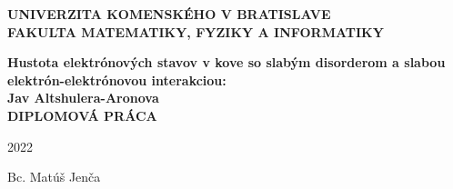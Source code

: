 \thispagestyle{empty}
\begin{center}
{\large \bf UNIVERZITA KOMENSKÉHO V BRATISLAVE \\
FAKULTA MATEMATIKY, FYZIKY A INFORMATIKY}
\end{center}
%

\vspace{2cm}

\vspace{1cm}
\begin{center}
{\large \bf Hustota elektrónových stavov v kove so slabým disorderom a slabou elektrón-elektrónovou interakciou:\\ Jav Altshulera-Aronova\\
\vspace{3cm}
DIPLOMOVÁ PRÁCA}
\end{center}

\vfill
%
\begin{multicols}{2}
{\bf
\begin{flushleft} 2022 \end{flushleft}
\begin{flushright} Bc. Matúš Jenča \end{flushright} 
}
\end{multicols}
